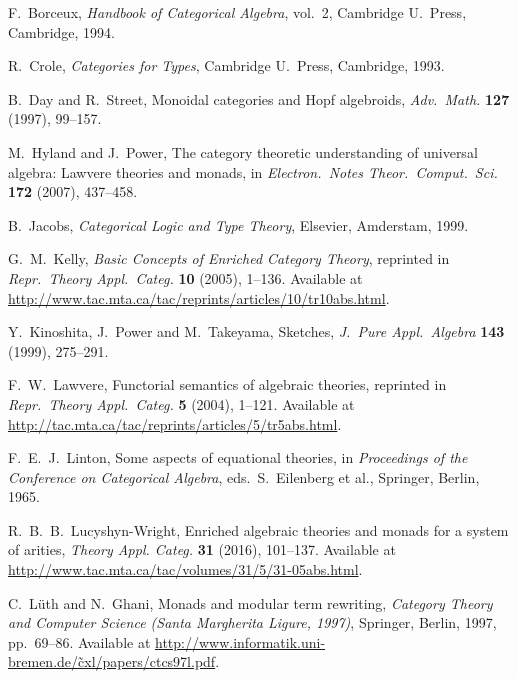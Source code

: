 \documentclass{amsart}
\theoremstyle{definition}
\begin{document}
\begin{thebibliography}{100}
 F.\ Borceux, \textsl{Handbook of Categorical Algebra}, vol.\ 2, Cambridge U.\ Press, Cambridge, 1994.

 R.\ Crole, \textsl{Categories for Types}, Cambridge U.\ Press, Cambridge, 1993.

 B.\ Day and R.\ Street, Monoidal categories and Hopf algebroids,
\textsl{Adv.\ Math.} \textbf{127} (1997), 99--157.

 M.\ Hyland and J.\ Power, The category theoretic understanding of 
universal algebra: Lawvere theories and monads, in \textsl{Electron.\ Notes Theor.\ Comput.\ 
Sci.} \textbf{172} (2007), 437--458.

 B.\ Jacobs, \textsl{Categorical Logic and Type Theory}, Elsevier, Amderstam, 1999.
	
 G.\ M.\ Kelly, \textsl{Basic Concepts of Enriched Category Theory}, reprinted in
\textsl{Repr.\ Theory Appl.\ Categ.} \textbf{10} (2005), 1--136.  Available at \href{http://www.tac.mta.ca/tac/reprints/articles/10/tr10abs.html}{http://www.tac.mta.ca/tac/reprints/articles/10/tr10abs.html}.

 Y.\ Kinoshita, J.\ Power and M.\ Takeyama, Sketches,
\textsl{J.\ Pure Appl.\ Algebra} \textbf{143} (1999), 275--291.

 F.\ W.\ Lawvere, Functorial semantics of algebraic theories, reprinted in
\textsl{Repr.\ Theory Appl.\ Categ.} \textbf{5} (2004), 1--121.  Available at \href{http://tac.mta.ca/tac/reprints/articles/5/tr5abs.html}{http://tac.mta.ca/tac/reprints/articles/5/tr5abs.html}.

 F.\ E.\ J.\ Linton, Some aspects of equational theories, in 
\textsl{Proceedings of the Conference on Categorical Algebra}, eds.\ S.\ Eilenberg et al.,
Springer, Berlin, 1965.

 R.\ B.\ B.\ Lucyshyn-Wright, Enriched algebraic theories and monads for a system of arities, \textsl{Theory Appl. Categ.} \textbf{31} (2016), 101--137.  Available at \href{http://www.tac.mta.ca/tac/volumes/31/5/31-05abs.html}{http://www.tac.mta.ca/tac/volumes/31/5/31-05abs.html}.
	
 C.\ L\"{u}th and N.\ Ghani, Monads and modular term rewriting,
\textsl{Category Theory and Computer Science ({S}anta {M}argherita Ligure, 1997)}, Springer, Berlin, 1997, pp.\ 69--86.  Available at \href{http://www.informatik.uni-bremen.de/~cxl/papers/ctcs97l.pdf}{http://www.informatik.uni-bremen.de/\~cxl/papers/ctcs97l.pdf}.


\end{thebibliography}
\end{document}
